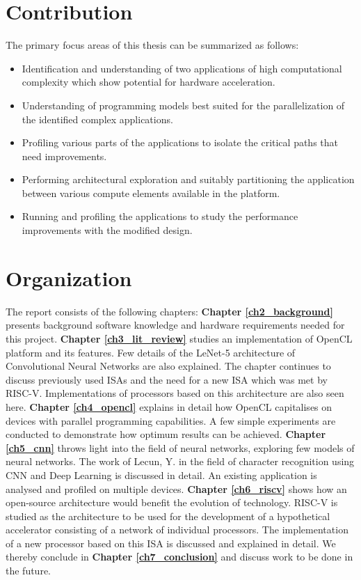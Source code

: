 \section{Contribution}
\label{sect1_2}
The primary focus areas of this thesis can be summarized as follows:
\begin{itemize}
\item Identification and understanding of two applications of high computational complexity which show potential for hardware acceleration.
\item Understanding of programming models best suited for the parallelization of the identified complex applications.
\item Profiling various parts of the applications to isolate the critical paths that need improvements.
\item Performing architectural exploration and suitably partitioning the application between various compute elements available in the platform.
\item Running and profiling the applications to study the performance improvements with the modified design.
\end{itemize}
\section{Organization}
\label{sect1_3}
The report consists of the following chapters: 
\textbf{Chapter \ref{ch2_background}} presents background software knowledge and hardware requirements needed for this project.
\textbf{Chapter \ref{ch3_lit_review}} studies an implementation of OpenCL platform and its features. Few details of the LeNet-5 architecture of Convolutional Neural Networks are also explained. The chapter continues to discuss previously used ISAs and the need for a new ISA which was met by RISC-V. Implementations of processors based on this architecture are also seen here.
\textbf{Chapter \ref{ch4_opencl}} explains in detail how OpenCL capitalises on devices with parallel programming capabilities. A few simple experiments are conducted to demonstrate how optimum results can be achieved. 
\textbf{Chapter \ref{ch5_cnn}} throws light into the field of neural networks, exploring few models of neural networks. The work of Lecun, Y. in the field of character recognition using \ac{CNN} and Deep Learning is discussed in detail. An existing application is analysed and profiled on multiple devices.
\textbf{Chapter \ref{ch6_riscv}} shows how an open-source architecture would benefit the evolution of technology. RISC-V is studied as the architecture to be used for the development of a hypothetical accelerator consisting of a network of individual processors. The implementation of a new processor based on this ISA is discussed and explained in detail. 
We thereby conclude in \textbf{Chapter \ref{ch7_conclusion}} and discuss work to be done in the future.